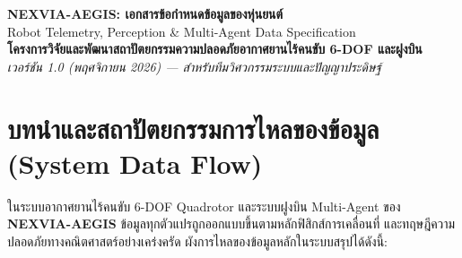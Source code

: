 \documentclass[11pt,a4paper]{article}
\begin{document}
\sloppy

\begin{tcolorbox}[colback=primary,coltext=white,boxrule=0pt,arc=3mm,boxsep=5mm]
    \begin{center}
        {\LARGE \textbf{NEXVIA-AEGIS: เอกสารข้อกำหนดข้อมูลของหุ่นยนต์}}\\[2mm]
        {\large Robot Telemetry, Perception \& Multi-Agent Data Specification}\\[2mm]
        \textbf{โครงการวิจัยและพัฒนาสถาปัตยกรรมความปลอดภัยอากาศยานไร้คนขับ 6-DOF และฝูงบิน}\\
        \textsl{เวอร์ชัน 1.0 (พฤศจิกายน 2026) --- สำหรับทีมวิศวกรรมระบบและปัญญาประดิษฐ์}
    \end{center}
\end{tcolorbox}

\vspace{3mm}

\section{บทนำและสถาปัตยกรรมการไหลของข้อมูล (System Data Flow)}
ในระบบอากาศยานไร้คนขับ 6-DOF Quadrotor และระบบฝูงบิน Multi-Agent ของ \textbf{NEXVIA-AEGIS} ข้อมูลทุกตัวแปรถูกออกแบบขึ้นตามหลักฟิสิกส์การเคลื่อนที่ และทฤษฎีความปลอดภัยทางคณิตศาสตร์อย่างเคร่งครัด ผังการไหลของข้อมูลหลักในระบบสรุปได้ดังนี้:
\end{document}
